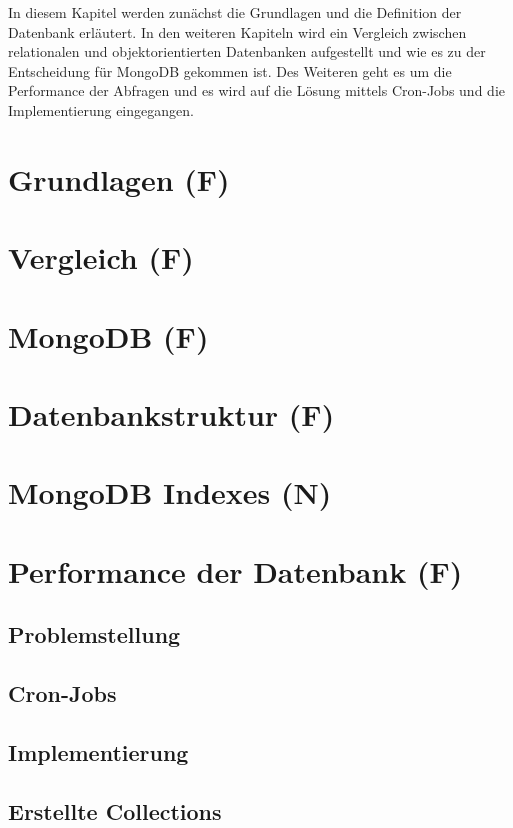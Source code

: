 In diesem Kapitel werden zunächst die Grundlagen und die Definition der Datenbank erläutert. In den weiteren Kapiteln wird ein Vergleich zwischen relationalen und objektorientierten Datenbanken aufgestellt und wie es zu der Entscheidung für MongoDB gekommen ist. Des Weiteren geht es um die Performance der Abfragen und es wird auf die Lösung mittels Cron-Jobs und die Implementierung eingegangen.

\section{Grundlagen (F)}


\section{Vergleich (F)}


\section{MongoDB (F)}


\section{Datenbankstruktur (F)}


\section{MongoDB Indexes (N)}

\newpage
\section{Performance der Datenbank (F)}


\subsection{Problemstellung}


\subsection{Cron-Jobs}


\subsection{Implementierung}


\subsection{Erstellte Collections}
